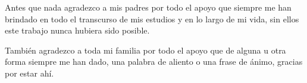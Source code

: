 
Antes que nada agradezco a mis padres por todo el apoyo que siempre me han brindado en todo el transcurso de mis estudios y en lo largo de mi vida, sin ellos este trabajo nunca hubiera sido posible. 

También agradezco a toda mi familia por todo el apoyo que de alguna u otra forma siempre me han dado, una palabra de aliento o una frase de ánimo, gracias por estar ahí. 
